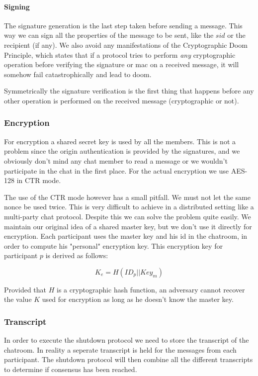 \paragraph{Signing} \label{signing}
The signature generation is the last step taken before sending a message. This
way we can sign all the properties of the message to be sent, like the $sid$ or the
recipient (if any). We also avoid any manifestations of the Cryptographic Doom
Principle, which states that if a protocol tries to perform \emph{any}
cryptographic operation before verifying the signature or mac on a received
message, it will somehow fail catastrophically and lead to doom.

Symmetrically the signature verification is the first thing that happens before
any other operation is performed on the received message (cryptographic or not).

\subsubsection{Encryption}
For encryption a shared secret key is used by all the members. This is not a
problem since the origin authentication is provided by the signatures, and
we obviously don't mind any chat member to read a message or we wouldn't
participate in the chat in the first place. For the actual encryption we
use AES-128 in CTR mode.

The use of the CTR mode however has a small pitfall. We must not let the same
nonce be used twice. This is very difficult to achieve in a distributed setting
like a multi-party chat protocol. Despite this we can solve the problem quite
easily. We maintain our original idea of a shared master key, but we don't use
it directly for encryption. Each participant uses the master key and his id in
the chatroom, in order to compute his "personal" encryption key. This encryption
key for participant $p$ is derived as follows:

\[
    K_e = H(ID_p || Key_m)
\]

Provided that $H$ is a cryptographic hash function, an adversary cannot recover
the value $K$ used for encryption as long as he doesn't know the master key.

\subsubsection{Transcript}
In order to execute the shutdown protocol we need to store the transcript of the chatroom.
In reality a seperate transcript is held for the messages from each participant.
The shutdown protocol will then combine all the different transcripts to determine if consensus has been reached.

